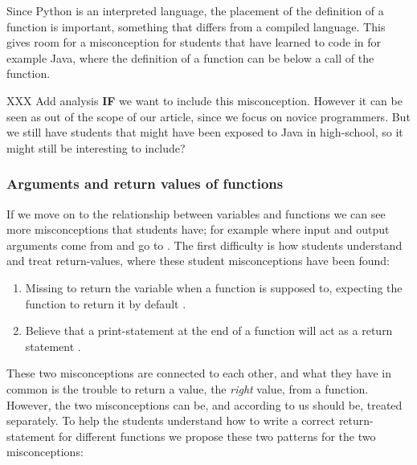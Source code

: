Since Python is an interpreted language, the placement of the definition of 
a function is important, something that differs from a compiled language. 
This gives 
room for a misconception for students that have learned to code in for 
example Java, where the definition of a function can be below a call of the 
function. 

XXX Add analysis \textbf{IF} we want to include this misconception. However 
it can be seen as out of the scope of our article, since we focus on novice 
programmers. But we still have students that might have been exposed to 
Java in high-school, so it might still be interesting to include?

\subsubsection{Arguments and return values of functions}

If we move on to the relationship between variables and functions we can see 
more misconceptions that students have; for example where input and output 
arguments 
come from and go to \parencite{Ragonis2005OOP}.
The first difficulty is how students understand and treat return-values, 
where these student misconceptions have been found: 

\begin{enumerate}
    \item Missing to return the variable when a function is supposed to, 
expecting the function to return it by default \parencite{
Kurvinen2016,KumarVeerasamy2016}.

    \item Believe that a print-statement at the end of a function will act 
as a return statement \parencite{MisconceptionsSurvey2017}.

\end{enumerate}
 

These two misconceptions are connected to each other, and what they have in 
common is the trouble to return a value, the \emph{right} value, from a 
function. However, the two misconceptions can be, and according to us 
should be, treated separately. To help the students understand how to write 
a correct return-statement for different functions we propose these two 
patterns for the two misconceptions:

